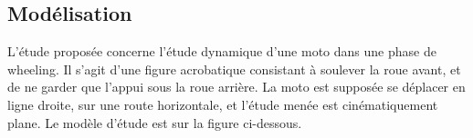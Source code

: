 \documentclass[10pt,fleqn]{article} %
\begin{document}
\def\pathfig{images}

\vspace{5cm}
\pagestyle{fancy}
\thispagestyle{plain}

\def\columnseprulecolor{\color{ocre}}
\setlength{\columnseprule}{0.4pt} 

\def\pathfig{images}

\ifprof
\else
\begin{multicols}{2}
\fi

\subsection*{Modélisation}
L'étude proposée concerne l'étude dynamique d'une moto dans une phase de wheeling. Il s’agit d’une figure acrobatique consistant à soulever la roue avant, et de ne garder que l’appui sous la roue arrière. La moto est supposée se déplacer en ligne droite, sur une route horizontale, et l'étude menée est cinématiquement plane. Le modèle d'étude est sur la figure ci-dessous.


\end{multicols}
\end{document}
